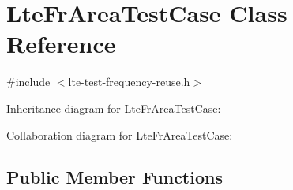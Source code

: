 \hypertarget{classLteFrAreaTestCase}{}\section{Lte\+Fr\+Area\+Test\+Case Class Reference}
\label{classLteFrAreaTestCase}


{\ttfamily \#include $<$lte-\/test-\/frequency-\/reuse.\+h$>$}



Inheritance diagram for Lte\+Fr\+Area\+Test\+Case\+:


Collaboration diagram for Lte\+Fr\+Area\+Test\+Case\+:
\subsection*{Public Member Functions}
